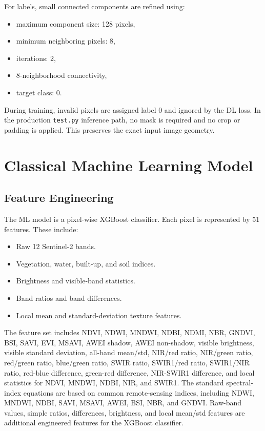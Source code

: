 \documentclass[11pt,a4paper]{article}
\begin{document}
For labels, small connected components are refined using:
\begin{itemize}[noitemsep]
  \item maximum component size: 128 pixels,
  \item minimum neighboring pixels: 8,
  \item iterations: 2,
  \item 8-neighborhood connectivity,
  \item target class: 0.
\end{itemize}

During training, invalid pixels are assigned label 0 and ignored by the DL loss. In the production \texttt{test.py} inference path, no mask is required and no crop or padding is applied. This preserves the exact input image geometry.

\section{Classical Machine Learning Model}

\subsection{Feature Engineering}

The ML model is a pixel-wise XGBoost classifier. Each pixel is represented by 51 features. These include:
\begin{itemize}[noitemsep]
  \item Raw 12 Sentinel-2 bands.
  \item Vegetation, water, built-up, and soil indices.
  \item Brightness and visible-band statistics.
  \item Band ratios and band differences.
  \item Local mean and standard-deviation texture features.
\end{itemize}

The feature set includes NDVI, NDWI, MNDWI, NDBI, NDMI, NBR, GNDVI, BSI, SAVI, EVI, MSAVI, AWEI shadow, AWEI non-shadow, visible brightness, visible standard deviation, all-band mean/std, NIR/red ratio, NIR/green ratio, red/green ratio, blue/green ratio, SWIR ratio, SWIR1/red ratio, SWIR1/NIR ratio, red-blue difference, green-red difference, NIR-SWIR1 difference, and local statistics for NDVI, MNDWI, NDBI, NIR, and SWIR1. The standard spectral-index equations are based on common remote-sensing indices, including NDWI, MNDWI, NDBI, SAVI, MSAVI, AWEI, BSI, NBR, and GNDVI. Raw-band values, simple ratios, differences, brightness, and local mean/std features are additional engineered features for the XGBoost classifier.
\end{document}
